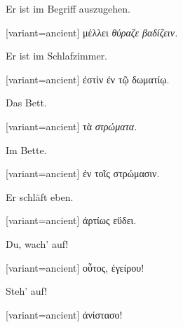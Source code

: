 Er ist im Begriff aus\textcompwordmark{}zugehen.

\switchcolumn

\begin{greek}[variant=ancient]%
μέλλει \emph{θύραζε βαδίζειν.}

\end{greek}%
Er ist im Schlafzimmer.

\switchcolumn

\begin{greek}[variant=ancient]%
ἐστὶν ἐν τῷ δωματίῳ.

\end{greek}%
\switchcolumn*

Das Bett.

\switchcolumn

\begin{greek}[variant=ancient]%
τὰ \emph{στρώματα.}

\end{greek}%
\switchcolumn*

Im Bette.

\switchcolumn

\begin{greek}[variant=ancient]%
ἐν τοῖς στρώμασιν.

\end{greek}%
\switchcolumn*

Er schläft eben.

\switchcolumn

\begin{greek}[variant=ancient]%
ἀρτίως εὕδει.

\end{greek}%
\switchcolumn*

Du, wach' auf!

\switchcolumn

\begin{greek}[variant=ancient]%
οὗτος, ἐγείρου!

\end{greek}%
\switchcolumn*

Steh' auf!

\switchcolumn

\begin{greek}[variant=ancient]%
ἀνίστασο!

\end{greek}%
\switchcolumn*

